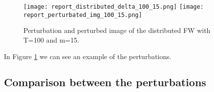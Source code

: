 \begin{figure}[htbp]
	\centering
	\texttt{[image: report\_distributed\_delta\_100\_15.png]}\hfil
	\texttt{[image: report\_perturbated\_img\_100\_15.png]}
	\caption{Perturbation and perturbed image of the distributed FW with T=100 and m=15.}
	\label{fig:distributed_delta_50+20}
\end{figure}
In Figure \ref{fig:distributed_delta_50+20} we can see an example of the perturbations.
\subsection{Comparison between the perturbations}
